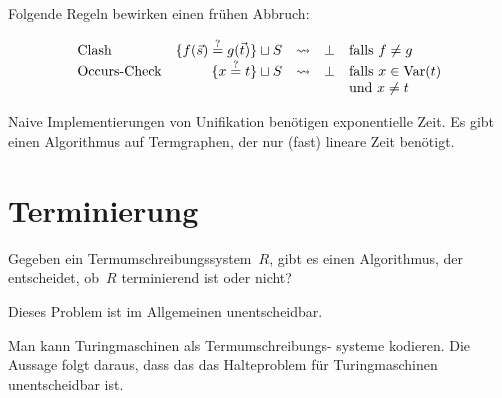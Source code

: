 \documentclass{cheat-sheet}
\DeclareMathOperator{\Var}{Var} %
\begin{document}
\begin{bem}
  Folgende Regeln bewirken einen frühen Abbruch:
  \begin{framed}
    \[
      \begin{array}{l r c l l}
        \text{Clash}
          & \{ f(\vec{s}) \overset{?}= g(\vec{t}) \} \sqcup S
          & \rightsquigarrow
          & \bot
          & \text{falls $f \neq g$} \\
        \text{Occurs-Check}
          & \{ x \overset{?}= t \} \sqcup S
          & \rightsquigarrow
          & \bot
          & \text{falls $x \in \Var(t)$} \\
          &&&& \text{und $x \neq t$}
      \end{array}
    \]
  \end{framed}
\end{bem}




\begin{bem}
  Naive Implementierungen von Unifikation benötigen exponentielle Zeit.
  Es gibt einen Algorithmus auf Termgraphen, der nur (fast) lineare Zeit benötigt.
\end{bem}

\section{Terminierung}




\begin{problem}
  Gegeben ein Termumschreibungssystem~$R$, gibt es einen Algorithmus, der entscheidet, ob~$R$ terminierend ist oder nicht?
\end{problem}

\begin{thm}
  Dieses Problem ist im Allgemeinen unentscheidbar.
\end{thm}

\begin{beweisidee}
  Man kann Turingmaschinen als Termumschreibungs- systeme kodieren.
  Die Aussage folgt daraus, dass das das Halteproblem für Turingmaschinen unentscheidbar ist.
\end{beweisidee}
\end{document}
